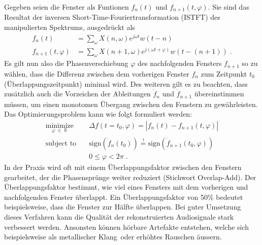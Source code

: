 Gegeben seien die Fenster als Funtionen $f_n(t)$ und $f_{n+1}(t, \varphi)$.
Sie sind das Resultat der inversen Short-Time-Fouriertransformation (ISTFT) des manipulierten Spektrums,
ausgedrückt als
\begin{equation}
    \begin{aligned}
        f_n(t)
        &=
        \sum_{\omega} X(n, \omega) e^{j\omega t} w(t - n) \\
        f_{n+1}(t, \varphi)
        &=
        \sum_{\omega} X(n+1, \omega) e^{j(\omega t + \varphi)} w(t - (n+1)) \;.
    \end{aligned}
\end{equation}
Es gilt nun also die Phasenverschiebung $\varphi$ des nachfolgenden Fensters $f_{n+1}$ so zu wählen,
dass die Differenz zwischen dem vorherigen Fenster $f_n$ zum Zeitpunkt $t_0$ (Überlappungszeitpunkt) minimal wird.
Des weiteren gilt es zu beachten, dass zusätzlich auch die Vorzeichen der Ableitungen $\dot{f}_n$ und $\dot{f}_{n+1}$ übereinstimmen müssen,
um einen monotomen Übergang zwischen den Fenstern zu gewährleisten.
Das Optimierungsproblem kann wie folgt formuliert werden:
\begin{equation}
    \begin{aligned}
        \underset{\varphi \; \in \; \mathbb{R}}{\text{minimize}}
        & \quad
        \Delta f(t=t_0, \varphi) = |f_n(t) - f_{n + 1}(t, \varphi)| \\
        \text{subject to}
        & \quad
        \text{sign}(\dot{f}_n(t_0)) \stackrel{!}{=} \text{sign}(\dot{f}_{n + 1}(t_0, \varphi)) \\
        & \quad
        0 \leq \varphi < 2\pi \;.
    \end{aligned}
\end{equation}
In der Praxis wird oft mit einem Überlappungsfaktor zwischen den Fenstern gearbeitet, der die Phasensprünge weiter reduziert (Stichwort Overlap-Add).
Der Überlappungsfaktor bestimmt, wie viel eines Fensters mit dem vorherigen und nachfolgenden Fenster überlappt.
Ein Überlappungsfaktor von 50\% bedeutet beispielsweise, dass die Fenster zur Hälfte überlappen.
Bei guter Umsetzung dieses Verfahren kann die Qualität der rekonstruierten Audiosignale stark verbessert werden.
Ansonsten können hörbare Artefakte entstehen, welche sich beispielsweise als \glqq metallischer Klang\grqq\ oder erhöhtes Rauschen äussern.


